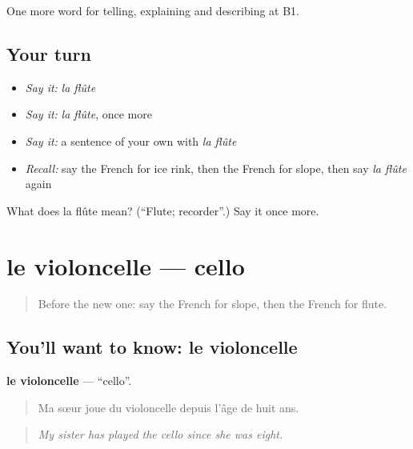 \begin{grammarlens}[title={What you've built}]
One more word for telling, explaining and describing at B1.
\end{grammarlens}

\subsection*{Your turn}
\begin{itemize}
\raggedright
  \item \emph{Say it:} \emph{la flûte}
  \item \emph{Say it:} \emph{la flûte}, once more
  \item \emph{Say it:} a sentence of your own with \emph{la flûte}
  \item \emph{Recall:} say the French for ice rink, then the French for slope, then say \emph{la flûte} again
\end{itemize}

\begin{tcolorbox}[breakable,colback=teal!4,colframe=teal!35!black,title={Before you move on}]
What does la flûte mean? (\textquotedblleft{}Flute; recorder\textquotedblright{}.) Say it once more.
\end{tcolorbox}
\section[le violoncelle]{le violoncelle — cello}

\label{lesson:FR-C511-violoncelle}



\begin{quote}
Before the new one: say the French for slope, then the French for flute.
\end{quote}

\subsection*{You'll want to know: le violoncelle}
\textbf{le violoncelle} — \textquotedblleft{}cello\textquotedblright{}.

\begin{quote}
Ma sœur joue du violoncelle depuis l'âge de huit ans.
\end{quote}

\begin{quote}
\emph{My sister has played the cello since she was eight.}
\end{quote}

